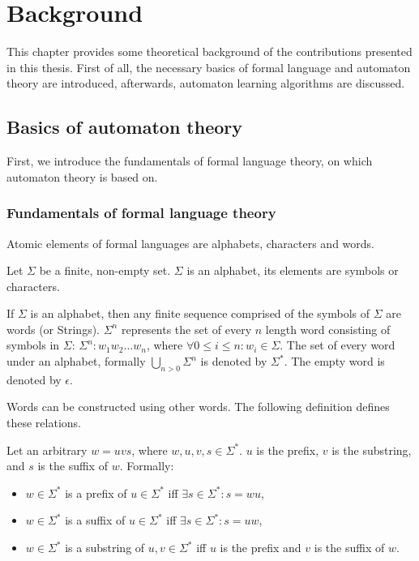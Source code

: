 \chapter{Background} \label{background}

This chapter provides some theoretical background of the contributions presented in this thesis. First of all, the necessary basics of formal language and automaton theory are introduced, afterwards, automaton learning algorithms are discussed.

\section{Basics of automaton theory}

First, we introduce the fundamentals of formal language theory, on which automaton theory is based on. 

\subsection{Fundamentals of formal language theory}
Atomic elements of formal languages are alphabets, characters and words.

\begin{definition}[Alphabet]
	Let $\Sigma$ be a finite, non-empty set. $\Sigma$ is an alphabet, its elements are symbols or characters.
\end{definition}

\begin{definition}[Word]
	If $\Sigma$ is an alphabet, then any finite sequence comprised of the symbols of $\Sigma$ are words (or Strings). $\Sigma^{n}$ represents the set of every $n$ length word consisting of symbols in $\Sigma$: $\Sigma^{n}: w_1w_2\ldots w_n$, where $\forall 0 \leq i \leq n: w_i \in \Sigma$. The set of every word under an alphabet, formally $\bigcup\limits_{n>0}^{} \Sigma^{n}$ is denoted by $\Sigma^{*}$. The empty word is denoted by $\epsilon$.
\end{definition}

Words can be constructed using other words. The following definition defines these relations.

\begin{definition}
	Let an arbitrary $w = uvs$, where $w, u, v, s\in\Sigma^*$. $u$ is the prefix, $v$ is the substring, and $s$ is the suffix of $w$. Formally:
	\begin{itemize}
		\item $w\in\Sigma^*$ is a prefix of $u\in\Sigma^*$ iff $\exists s\in\Sigma^*: s=wu$,
		\item $w\in\Sigma^*$ is a suffix of $u\in\Sigma^*$ iff $\exists s\in\Sigma^*: s=uw$,
		\item $w\in\Sigma^*$ is a substring of $u, v\in\Sigma^*$ iff $u$ is the prefix and $v$ is the suffix of $w$.
	\end{itemize}
\end{definition}

